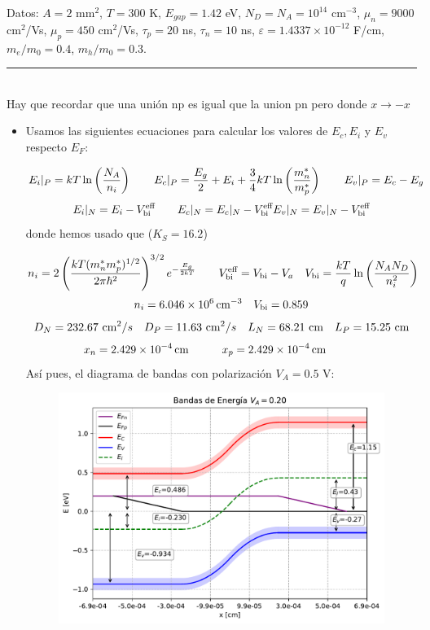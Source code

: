 Datos: $A = 2$ mm$^2$, $T = 300$ K, $E_{gap} = 1.42$ eV, $N_D = N_A = 10^{14}$ cm$^{-3}$, 
$\mu_n = 9000$ cm$^2$/Vs, $\mu_p = 450$ cm$^2$/Vs, $\tau_p = 20$ ns, $\tau_n = 10$ ns, 
$\varepsilon = 1.4337 \times 10^{-12}$ F/cm, $m_e/m_0 = 0.4$, $m_h/m_0 = 0.3$.


\rule{\textwidth}{0.1pt} \\[2pt]


Hay que recordar que una unión np es igual que la union pn pero donde $x\rightarrow -x$
\begin{itemize}
    \item Usamos las siguientes ecuaciones para calcular los valores de $E_c,E_i$ y $E_v$ respecto $E_F$: 
    
    \begin{equation*}
        E_i|_P =  k T \ln \left( \frac{N_A}{n_i} \right) \qquad E_c|_P = \frac{E_g}{2} + E_i + \frac{3}{4} kT \ln \left( \frac{m_n^*}{m_p^*} \right) \qquad E_v |_P = E_c - E_g
    \end{equation*}
    \begin{equation*}
        E_i|_N = E_i - V_{\text{bi}}^\text{eff}  \qquad E_c|_N = E_c|_N - V_{\text{bi}}^\text{eff} E_v |_N = E_v|_N - V_{\text{bi}}^\text{eff} 
    \end{equation*}
    donde hemos usado que ($K_S=16.2$)

    \begin{equation*}
        n_i = 2 \left( \frac{kT (m_n^* m_p^* )^{1/2}}{2\pi \hbar^2} \right)^{3/2} e^{-\frac{E_g}{2kT}} 
    \qquad V_{\text{bi}}^{\text{eff}} = V_{\text{bi}} - V_a \quad V_{\text{bi}} = \frac{kT}{q} \ln \left( \frac{N_AN_D}{n_i^2} \right)
    \end{equation*}
    \begin{equation}
        n_i=\SI{6.046e+6}{cm^{-3}} \quad V_{\text{bi}} = 0.859 
    \end{equation}
    \begin{equation}
        D_N = 232.67 \ \cm^2/s \quad D_P =  11.63 \ \cm^2/s \quad L_N = 68.21 \ \cm \quad L_P = 15.25 \ \cm
    \end{equation}
    \begin{equation}
        x_n = \SI{2.429e-4}{cm} \quad \quad \quad 
        x_p = \SI{2.429e-4}{cm} \quad \quad \quad 
    \end{equation}
    Así pues, el diagrama de bandas con polarización $V_A=0.5$ V: 

    \begin{figure}[h!] \centering
        \includegraphics[width=0.6\linewidth]{Cuerpo/Ch_03/03_06_01.pdf}
    \end{figure}
    


\end{itemize}
